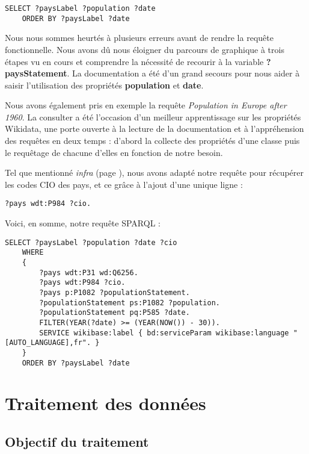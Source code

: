 \documentclass[hidelinks, 12pt]{article}
\begin{document}
\begin{lstlisting}[language=SPARQL]
	SELECT ?paysLabel ?population ?date
	ORDER BY ?paysLabel ?date
\end{lstlisting}
		
Nous nous sommes heurtés à plusieurs erreurs avant de rendre la requête fonctionnelle. Nous avons dû nous éloigner du parcours de graphique à trois étapes vu en cours et comprendre la nécessité de recourir à la variable \textbf{?paysStatement}. La documentation a été d'un grand secours pour nous aider à saisir l'utilisation des propriétés \textbf{population}\autocite{wikipop} et \textbf{date}\autocite{wikidate}.
		
Nous avons également pris en exemple la requête \emph{Population in Europe after 1960}\autocite{wiki1960}. La consulter a été l'occasion d'un meilleur apprentissage sur les propriétés Wikidata, une porte ouverte à la lecture de la documentation et à l'appréhension des requêtes en deux temps : d'abord la collecte des propriétés d'une classe puis le requêtage de chacune d'elles en fonction de notre besoin.
		
Tel que mentionné \emph{infra} (page \pageref{CIO}), nous avons adapté notre requête pour récupérer les codes CIO des pays, et ce grâce à l'ajout d'une unique ligne :
		
\begin{lstlisting}[language=SPARQL]
	?pays wdt:P984 ?cio.
\end{lstlisting}
		
Voici, en somme, notre requête SPARQL :
		
\begin{lstlisting}[language=SPARQL]
	SELECT ?paysLabel ?population ?date ?cio
	WHERE 
	{
		?pays wdt:P31 wd:Q6256.
		?pays wdt:P984 ?cio.
		?pays p:P1082 ?populationStatement.
		?populationStatement ps:P1082 ?population. 
		?populationStatement pq:P585 ?date.
		FILTER(YEAR(?date) >= (YEAR(NOW()) - 30)).
		SERVICE wikibase:label { bd:serviceParam wikibase:language "[AUTO_LANGUAGE],fr". }
	}
	ORDER BY ?paysLabel ?date
\end{lstlisting}
		

\section{Traitement des données}
	
\subsection{Objectif du traitement}
		
\end{document}
